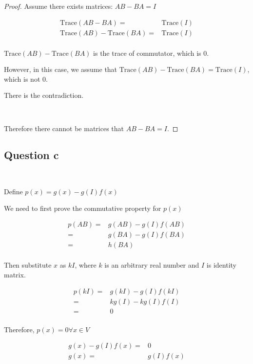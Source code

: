 \documentclass{article}
\def\Trace{\text{Trace}}
\begin{document}
\begin{proof}

Assume there exists matrices: $AB-BA=I$

\begin{equation*}
\begin{split}
\Trace(AB-BA)=&\Trace(I)\\
\Trace(AB)-\Trace(BA)=&\Trace(I)\\
\end{split}
\end{equation*}

$\Trace(AB)-\Trace(BA)$ is the trace of commutator, which is 0.

However, in this case, we assume that $\Trace(AB)-\Trace(BA)=\Trace(I)$, which is not 0.

There is the contradiction.

~

Therefore there cannot be matrices that $AB-BA=I$.
\end{proof}

\subsection{Question c}

~

Define $p(x)=g(x)-g(I)f(x)$

We need to first prove the commutative property for $p(x)$

\begin{equation*}
\begin{split}
p(AB)=&g(AB)-g(I)f(AB)\\
=&g(BA)-g(I)f(BA)\\
=&h(BA)\\
\end{split}
\end{equation*}

Then substitute $x$ as $kI$, where $k$ is an arbitrary real number and $I$ is identity matrix.

\begin{equation*}
\begin{split}
p(kI)=&g(kI)-g(I)f(kI)\\
=&kg(I)-kg(I)f(I)\\
=&0\\
\end{split}
\end{equation*}

Therefore, $p(x)=0 \forall x\in V$

\begin{equation*}
\begin{split}
g(x)-g(I)f(x)=&0\\
g(x)=&g(I)f(x)\\
\end{split}
\end{equation*}
\end{document}
